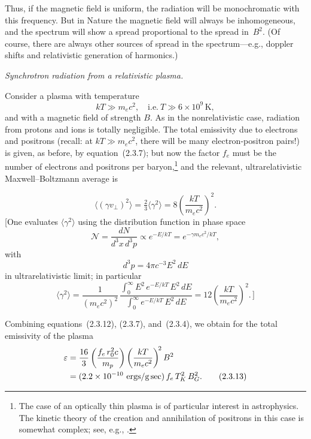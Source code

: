 Thus, if the magnetic field is uniform, the radiation will be monochromatic
with this frequency. But in Nature the magnetic field will always be inhomo\-geneous,
and the spectrum will show a spread proportional to the spread in~$B^2$.
(Of course, there are always other sources of spread in the spectrum---e.g., doppler
shifts and relativistic generation of harmonics.)

\textit{Synchrotron radiation from a relativistic plasma.}

\medskip
\noindent
Consider a plasma with temperature
\begin{equation}
kT \gg m_e c^2, \quad \text{i.e.}\ T \gg 6 \times 10^9\,\text{K},
\tag{2.3.11}
\end{equation}
and with a magnetic field of strength $B$.
As in the nonrelativistic case, radiation
from protons and ions is totally negligible.
The total emissivity due to electrons
and positrons (recall: at $kT \gg m_e c^2$, there will be many electron-positron pairs!)
is given, as before, by equation~(2.3.7); but now the factor $f_e$ must be the number
of electrons and positrons per baryon,\footnote{The case of an optically thin plasma
is of particular interest in astrophysics. The kinetic theory of the creation and
annihilation of positrons in this case is somewhat complex; see, e.g.,
\citet{BisnovatyiKogan1971}.}
and the relevant, ultrarelativistic Maxwell--Boltzmann average is

\begin{equation}
\langle (\gamma v_\perp)^2 \rangle = \tfrac{2}{3}\langle\gamma^2\rangle
= 8\left(\frac{kT}{m_e c^2}\right)^{\!2}.
\tag{2.3.12}
\end{equation}
[One evaluates $\langle\gamma^2\rangle$ using the distribution function in phase space
\begin{equation}
\mathscr{N} = \frac{dN}{d^3 x\,d^3 p} \propto e^{-E/kT} = e^{-\gamma m_e c^2/kT},
\tag*{}
\end{equation}
with
\begin{equation}
d^3 p = 4\pi c^{-3}E^2\,dE
\tag*{}
\end{equation}
in ultrarelativistic limit;
in particular
\begin{equation}
\langle\gamma^2\rangle = \frac{1}{(m_e c^2)^2}\,
\frac{\displaystyle\int_0^\infty E^2\,e^{-E/kT}\,E^2\,dE}
{\displaystyle\int_0^\infty e^{-E/kT}\,E^2\,dE}
= 12\left(\frac{kT}{m_e c^2}\right)^{\!2}.\,]
\tag*{}
\end{equation}

Combining equations~(2.3.12), (2.3.7), and~(2.3.4), we obtain for the total
emissivity of the plasma
\begin{align}
\varepsilon &= \frac{16}{3}\left(\frac{f_e\,r_0^2 c}{m_p}\right)
\left(\frac{kT}{m_e c^2}\right)^{\!2} B^2 \notag \\
&= (2.2 \times 10^{-10}~\text{ergs/g\,sec})\,f_e\,T_K^2\,B_G^2.
\tag{2.3.13}
\end{align}

